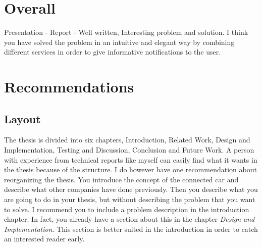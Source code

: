 \documentclass[
10pt, %
a4paper, %
oneside, %
headinclude,footinclude, %
BCOR5mm, %
]{scrartcl}
\title{\normalfont\spacedallcaps{Destination Prediction with Decision Tree}}
\author{\spacedlowsmallcaps{An opposition by Martin Agfjord*}}
\date{} %
\begin{document}
\renewcommand{\sectionmark}[1]{\markright{\spacedlowsmallcaps{#1}}}
\lehead{\mbox{\llap{\small\thepage\kern1em\color{halfgray} \vline}\color{halfgray}\hspace{0.5em}\rightmark\hfil}} %

\pagestyle{scrheadings} %

\maketitle %

{\let\thefootnote\relax{}

\section*{Overall}
Presentation -
\newline
\newline
\newline
\newline
\newline
\newline
Report - Well written, Interesting problem and solution.
I think you have solved the problem in an intuitive and elegant way by combining different services in order to give informative notifications to the user.

\section*{Recommendations}
\subsection*{Layout}

The thesis is divided into six chapters, Introduction, Related Work, Design and Implementation, Testing and Discussion, Conclusion and Future Work. A person with experience from technical reports like myself can easily find what it wants in the thesis because of the structure.
\newline
\newline
I do however have one recommendation about reorganizing the thesis. You introduce the concept of the connected car and describe what other companies have done previously. Then you describe what you are going to do in your thesis, but without describing the problem that you want to solve. I recommend you to include a problem description in the introduction chapter.
\newline
\newline
In fact, you already have a section about this in the chapter \emph{Design and Implementation}. This section is better suited in the introduction in order to catch an interested reader early.

}
\end{document}
